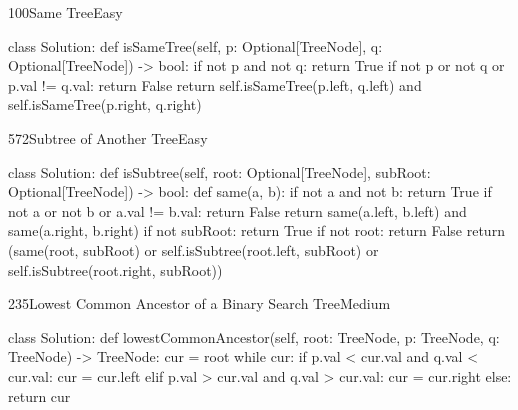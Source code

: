 \begin{problem}{100}{Same Tree}{Easy}
\begin{code}
class Solution:
    def isSameTree(self, p: Optional[TreeNode], q: Optional[TreeNode]) -> bool:
        if not p and not q:
            return True
        if not p or not q or p.val != q.val:
            return False
        return self.isSameTree(p.left, q.left) and self.isSameTree(p.right, q.right)
\end{code}
\end{problem}

\begin{problem}{572}{Subtree of Another Tree}{Easy}
\begin{code}
class Solution:
    def isSubtree(self, root: Optional[TreeNode], subRoot: Optional[TreeNode]) -> bool:
        def same(a, b):
            if not a and not b:
                return True
            if not a or not b or a.val != b.val:
                return False
            return same(a.left, b.left) and same(a.right, b.right)
        if not subRoot:
            return True
        if not root:
            return False
        return (same(root, subRoot) or self.isSubtree(root.left, subRoot)
                or self.isSubtree(root.right, subRoot))
\end{code}
\end{problem}

\begin{problem}{235}{Lowest Common Ancestor of a Binary Search Tree}{Medium}
\begin{code}
class Solution:
    def lowestCommonAncestor(self, root: TreeNode, p: TreeNode, q: TreeNode) -> TreeNode:
        cur = root
        while cur:
            if p.val < cur.val and q.val < cur.val:
                cur = cur.left
            elif p.val > cur.val and q.val > cur.val:
                cur = cur.right
            else:
                return cur
\end{code}
\end{problem}

